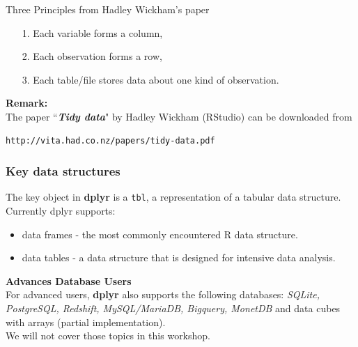 \documentclass{beamer}
\begin{document}
\begin{frame}[fragile]
\begin{framed}
	\noindent Three Principles from Hadley Wickham's paper
	\begin{itemize}
		\item[1.] Each variable forms a column, 
		\item[2.] Each observation forms a row, 
		\item[3.] Each table/file stores data about one kind of observation.
	\end{itemize}
\end{framed}
\noindent \textbf{Remark:} \\  The paper ``\textit{\textbf{Tidy data}}" by Hadley Wickham (RStudio) can be downloaded from 
\begin{verbatim}
http://vita.had.co.nz/papers/tidy-data.pdf
\end{verbatim}
\end{frame}
\begin{frame}
\frametitle{Key data structures}

The key object in \textbf{dplyr} is a \texttt{tbl}, a representation of a tabular data structure. Currently dplyr supports:

\begin{itemize}
	\item data frames - the  most commonly encountered R data structure. 
	\item data tables - a data structure that is designed for intensive data analysis.
\end{itemize}

\end{frame}
\begin{frame}
	\textbf{Advances Database Users}\\
\noindent For advanced users, \textbf{dplyr} also supports the following databases: \textit{SQLite, PostgreSQL, Redshift, MySQL/MariaDB, Bigquery, MonetDB} and data cubes with arrays (partial implementation).\\ \bigskip We will not cover those topics in this workshop.
\end{frame}
\end{document}
